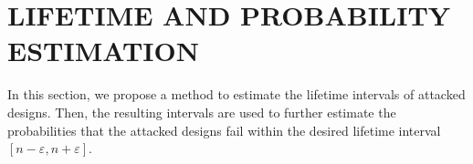 
\begin{comment}
\section{LIFETIME ESTIMATION}
\label{sec:lt_estimation}
In this section, we propose a method to estimate the lifetime interval of attacked designs, considering the workload variations based on the aforementioned assumption and definition of critical operational mode.

Based on the assumption, the union of critical operational modes of all candidate paths is equivalent to the universal set of operational modes, i.e., all operational modes. Thus, for the purpose of covering all operational modes, we have to consider the severe aging condition of each candidate path, such that the associated critical operational modes are applied to predict the lifetime of other paths using a binary search method.

For example, given the candidate path $i$, the other path $j$, and time variable $t$, the goal of the method is to predict $j's$ lifetime by binarily searching toward a convergent $t$. That is, during the binary search, the timing variable $t$ will be iteratively calibrated according to the $j's$ setup timing constraint, formulated in Equation~(\ref{eq:setup}), and eventually $j's$ lifetime will converge toward the value of $t$. Where $j's$ aging rate is derived by the aging correlation between $i$ and $j$ (i.e., regression equation of $i$ on $j$) and $i's$ aging rate is derived from Equation~(\ref{eq:worst}). 
As a result, when $i$ is considered undergoing severe aging, we can obtain the other paths' lifetimes, among which we choose the smallest one as the lifetime of the attacked design.

In accordance with the former procedure, we can derive one lifetime value of a path being compromised with malicious aging. By considering all candidate paths undergoing severe aging, we can derive a group of lifetime values, among which smallest one and biggest one are the resulting interval based on the attack.
\end{comment}
\section{LIFETIME AND PROBABILITY ESTIMATION}
\label{sec:lt_estimation}
In this section, we propose a method to estimate the lifetime intervals of attacked designs. Then, the resulting intervals are used to further estimate the probabilities that the attacked designs fail within the desired lifetime interval $[n-\varepsilon, n+\varepsilon]$.
